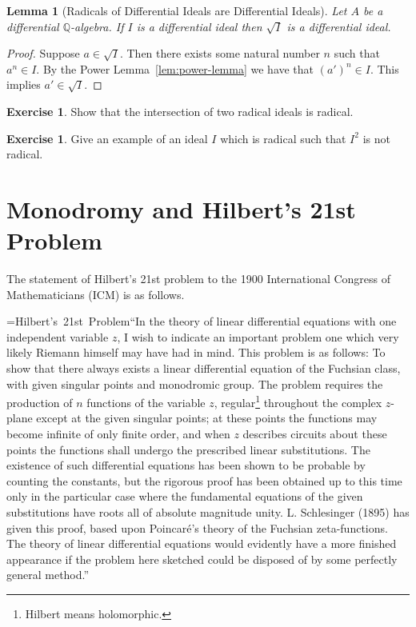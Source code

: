 \documentclass[12pt]{book}
\numberwithin{equation}{section}
\newtheorem{lemma}[theorem]{Lemma}
\theoremstyle{definition}
\newtheorem{exercise}[theorem]{Exercise}
\theoremstyle{remark}
\newcommand{\QQ}{\mathbb{Q}}
\def\quoteattr#1#2{\setbox0=\hbox{#2}#1\tabto{\dimexpr\linewidth-\wd0}\box0}
\begin{document}
\begin{lemma}[Radicals of Differential Ideals are Differential Ideals]
	Let $A$ be a differential $\QQ$-algebra. 
	If $I$ is a differential ideal then $\sqrt{I}$ is a differential ideal. 
\end{lemma}
\begin{proof}
	Suppose $a \in \sqrt{I}$. 
	Then there exists some natural number $n$ such that $a^n \in I$. 
	By the Power Lemma~\ref{lem:power-lemma} we have that $(a')^n \in I$. 
	This implies $a' \in \sqrt{I}$. 
\end{proof}

\begin{exercise}
	Show that the intersection of two radical ideals is radical.
\end{exercise}

\begin{exercise}
	Give an example of an ideal $I$ which is radical such that $I^2$ is not radical.
\end{exercise}


\chapter{Monodromy and Hilbert's 21st Problem }
The statement of Hilbert's 21st problem to the 1900 International Congress of Mathematicians (ICM) is as follows. 

\quoteattr{``In the theory of linear differential equations with one independent variable $z$, I wish to indicate an important problem one which very likely Riemann himself may have had in mind. 
	This problem is as follows: To show that there always exists a linear differential equation of the Fuchsian class, with given singular points and monodromic group. 
	The problem requires the production of $n$ functions of the variable $z$, regular\footnote{Hilbert means holomorphic.} throughout the complex $z$-plane except at the given singular points; at these points the functions may become infinite of only finite order, and when $z$ describes circuits about these points the functions shall undergo the prescribed linear substitutions. 
	The existence of such differential equations has been shown to be probable by counting the constants, but the rigorous proof has been obtained up to this time only in the particular case where the fundamental equations of the given substitutions have roots all of absolute magnitude unity. L. Schlesinger (1895) has given this proof, based upon Poincaré's theory of the Fuchsian zeta-functions. 
	The theory of linear differential equations would evidently have a more finished appearance if the problem here sketched could be disposed of by some perfectly general method.''}{Hilbert's 21st Problem}
\end{document}
